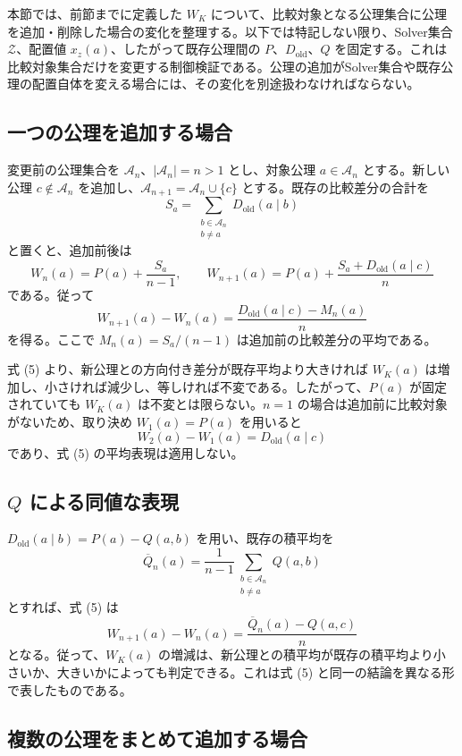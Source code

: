 \documentclass[a4paper,11pt]{ltjsarticle}
\begin{document}
本節では、前節までに定義した $W_K$ について、比較対象となる公理集合に公理を追加・削除した場合の変化を整理する。以下では特記しない限り、Solver集合 $\mathcal Z$、配置値 $x_z(a)$、したがって既存公理間の $P$、$D_{\mathrm{old}}$、$Q$ を固定する。これは比較対象集合だけを変更する制御検証である。公理の追加がSolver集合や既存公理の配置自体を変える場合には、その変化を別途扱わなければならない。

\subsection{一つの公理を追加する場合}

変更前の公理集合を $\mathcal A_n$、$|\mathcal A_n|=n>1$ とし、対象公理 $a\in\mathcal A_n$ とする。新しい公理 $c\notin\mathcal A_n$ を追加し、$\mathcal A_{n+1}=\mathcal A_n\cup\{c\}$ とする。既存の比較差分の合計を
\[
S_a=\sum_{\substack{b\in\mathcal A_n\\b\ne a}}D_{\mathrm{old}}(a\mid b)
\]
と置くと、追加前後は
\[
W_n(a)=P(a)+\frac{S_a}{n-1},\qquad
W_{n+1}(a)=P(a)+\frac{S_a+D_{\mathrm{old}}(a\mid c)}{n}
\]
である。従って
\[
\boxed{
W_{n+1}(a)-W_n(a)
=\frac{D_{\mathrm{old}}(a\mid c)-M_n(a)}{n}
}
\tag{5}
\]
を得る。ここで $M_n(a)=S_a/(n-1)$ は追加前の比較差分の平均である。

式 (5) より、新公理との方向付き差分が既存平均より大きければ $W_K(a)$ は増加し、小さければ減少し、等しければ不変である。したがって、$P(a)$ が固定されていても $W_K(a)$ は不変とは限らない。$n=1$ の場合は追加前に比較対象がないため、取り決め $W_1(a)=P(a)$ を用いると
\[
W_2(a)-W_1(a)=D_{\mathrm{old}}(a\mid c)
\]
であり、式 (5) の平均表現は適用しない。

\subsection{$Q$ による同値な表現}

$D_{\mathrm{old}}(a\mid b)=P(a)-Q(a,b)$ を用い、既存の積平均を
\[
\overline Q_n(a)=\frac{1}{n-1}\sum_{\substack{b\in\mathcal A_n\\b\ne a}}Q(a,b)
\]
とすれば、式 (5) は
\[
\boxed{
W_{n+1}(a)-W_n(a)
=\frac{\overline Q_n(a)-Q(a,c)}{n}
}
\tag{6}
\]
となる。従って、$W_K(a)$ の増減は、新公理との積平均が既存の積平均より小さいか、大きいかによっても判定できる。これは式 (5) と同一の結論を異なる形で表したものである。

\subsection{複数の公理をまとめて追加する場合}
\end{document}
